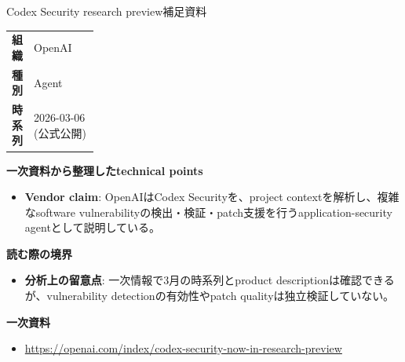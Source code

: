 \begin{technicalnote}{Codex Security research preview}{補足資料}
\begingroup
\begin{tabularx}{\linewidth}{@{}>{\bfseries}p{0.22\linewidth}X@{}}
組織 & OpenAI \\
種別 & Agent \\
時系列 & 2026-03-06 (公式公開) \\
\end{tabularx}
\smallskip
{\bfseries 一次資料から整理したtechnical points}
\begin{itemize}[leftmargin=1.5em,itemsep=0.35em]
\item \textbf{Vendor claim}: OpenAIはCodex Securityを、project contextを解析し、複雑なsoftware vulnerabilityの検出・検証・patch支援を行うapplication-security agentとして説明している。
\end{itemize}
\begin{minipage}{\linewidth}
{\bfseries 読む際の境界}
\begin{itemize}[leftmargin=1.5em,itemsep=0.35em]
\item \textbf{分析上の留意点}: 一次情報で3月の時系列とproduct descriptionは確認できるが、vulnerability detectionの有効性やpatch qualityは独立検証していない。
\end{itemize}
\begin{samepage}
{\bfseries 一次資料}
\begingroup\sloppy
\begin{itemize}[leftmargin=1.5em,itemsep=0.25em]
\item {\scriptsize\url{https://openai.com/index/codex-security-now-in-research-preview}}
\end{itemize}
\endgroup
\end{samepage}
\end{minipage}
\endgroup
\end{technicalnote}
\medskip
